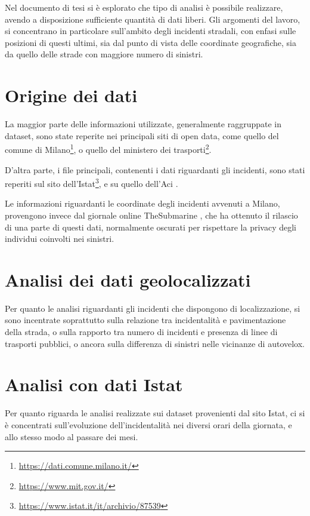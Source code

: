\documentclass[a4paper]{article}
\begin{document}
Nel documento di tesi si è esplorato che tipo di analisi è possibile realizzare, 
avendo a disposizione sufficiente quantità di dati liberi. 
Gli argomenti del lavoro, si concentrano in particolare sull'ambito degli incidenti stradali, 
con enfasi sulle posizioni di questi ultimi, sia dal punto di vista delle coordinate 
geografiche, sia da quello delle strade con maggiore numero di sinistri. 

\section{Origine dei dati}

La maggior parte delle informazioni utilizzate, generalmente raggruppate in dataset, sono 
state reperite nei principali siti di open data, come quello del comune di 
Milano\footnote{\url{https://dati.comune.milano.it/}}, o 
quello del ministero dei trasporti\footnote{\url{https://www.mit.gov.it/}}.

D'altra parte, i file principali, contenenti i dati riguardanti gli incidenti, sono 
stati reperiti sul sito 
dell'Istat\footnote{\url{https://www.istat.it/it/archivio/87539}}, e su quello 
dell'Aci \cite{ACI:1}.

Le informazioni riguardanti le coordinate degli incidenti avvenuti a Milano, provengono invece 
dal giornale online TheSubmarine \cite{SUBMARINE:1}, 
che ha ottenuto il rilascio di una parte di questi dati, 
normalmente oscurati per rispettare la privacy degli individui coinvolti nei sinistri.

\section{Analisi dei dati geolocalizzati}

Per quanto le analisi riguardanti gli incidenti che dispongono di localizzazione, 
si sono incentrate soprattutto sulla relazione tra incidentalità e pavimentazione 
della strada, o sulla rapporto tra numero di incidenti e presenza di linee di 
trasporti pubblici, o ancora sulla differenza di sinistri nelle vicinanze di autovelox. 

\section{Analisi con dati Istat}

Per quanto riguarda le analisi realizzate sui dataset provenienti dal sito Istat, 
ci si è concentrati sull'evoluzione dell'incidentalità nei diversi orari della giornata, 
e allo stesso modo al passare dei mesi. 
\end{document}
